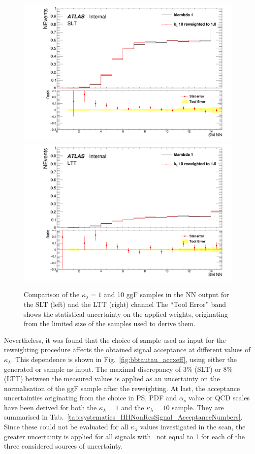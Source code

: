 \begin{figure}
  \begin{center}
      \includegraphics[width=.47\textwidth]{DiHiggs/plots/kl_SLTLimit_binning_SM_NN.png}
      \includegraphics[width=.47\textwidth]{DiHiggs/plots/kl_LTTLimit_binning_SM_NN.png} \\
  \end{center}
  \caption{Comparison of the $\kappa_\lambda = 1$ and 10 ggF samples in the NN output for the SLT (left) and the LTT (right) channel
  The ``Tool Error'' band shows the statistical uncertainty on the applied weights, 
  originating from the limited size of the samples used to derive them.}
  \label{fig:kl_closure_bbtautau_ggf}
\end{figure}


Nevertheless, it was found that the choice of sample used as 
input for the reweighting procedure affects the obtained signal 
acceptance at different values of $\kappa_\lambda$. 
This dependence is shown in Fig.~\ref{fig:bbtautau_accxeff},
using either the generated  or  sample as input.
The maximal discrepancy of 3\% (SLT) or 8\% (LTT) between the measured values is applied as an uncertainty 
on the normalisation of the ggF sample after the reweighting. 
At last, the acceptance uncertainties originating from the choice 
in PS, PDF and $\alpha_s$ value or QCD scales have been derived 
for both the $\kappa_\lambda = 1$ 
and the $\kappa_\lambda = 10$ sample.
They are summarised in Tab.~\ref{tab:systematics_HHNonResSignal_AcceptanceNumbers}.
Since these could not be evaluated for all $\kappa_\lambda$ values investigated in the scan,
the greater uncertainty is applied for all signals with \kl\ not equal to 1 for each of the 
three considered sources of uncertainty.




